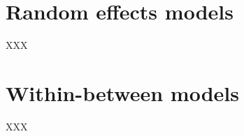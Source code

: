 \documentclass[]{book}
\begin{document}
\hypertarget{random-effects-models}{%
\chapter{Random effects models}\label{random-effects-models}}

XXX

\hypertarget{within-between-models}{%
\chapter{Within-between models}\label{within-between-models}}

XXX


\end{document}
